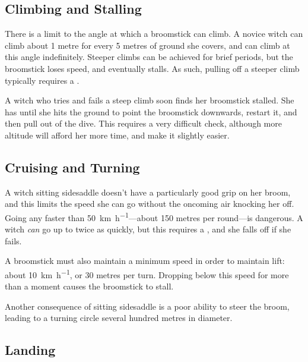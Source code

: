 
\subsection{Climbing and Stalling}

There is a limit to the angle at which a broomstick can climb.
A novice witch can climb about 1 metre for every 5 metres of ground she covers, and can climb at this angle indefinitely.
Steeper climbs can be achieved for brief periods, but the broomstick loses speed, and eventually stalls.
As such, pulling off a steeper climb typically requires a {\test}.

A witch who tries and fails a steep climb soon finds her broomstick stalled.
She has until she hits the ground to point the broomstick downwards, restart it, and then pull out of the dive.
This requires a very difficult check, although more altitude will afford her more time, and make it slightly easier.

\subsection{Cruising and Turning}

A witch sitting sidesaddle doesn't have a particularly good grip on her broom, and this limits the speed she can go without the oncoming air knocking her off.
Going any faster than \SI{50}{\kilo\metre\per\hour}---about 150 metres per round---is dangerous.
A witch \emph{can} go up to twice as quickly, but this requires a {\test}, and she falls off if she fails.

A broomstick must also maintain a minimum speed in order to maintain lift: about \SI{10}{\kilo\metre\per\hour}, or 30 metres per turn.
Dropping below this speed for more than a moment causes the broomstick to stall.

Another consequence of sitting sidesaddle is a poor ability to steer the broom, leading to a turning circle several hundred metres in diameter.

\subsection{Landing}

